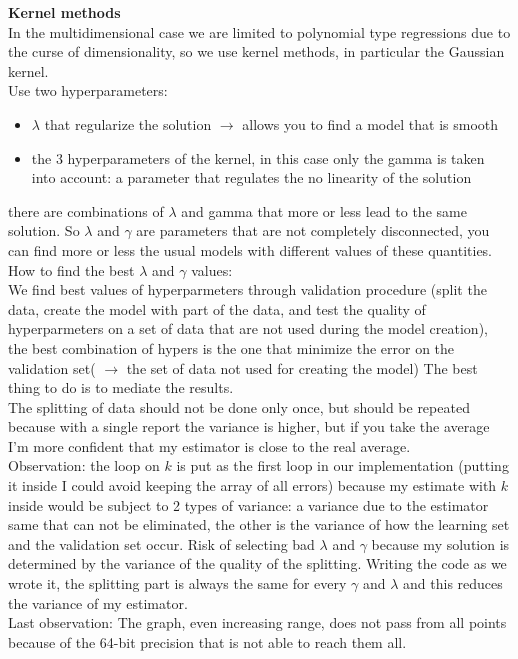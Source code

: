 \textbf {Kernel methods}\\

In the multidimensional case we are limited to polynomial type regressions due to the curse of dimensionality, so we use kernel methods, in particular the Gaussian kernel.\\
Use two hyperparameters:
\begin{itemize}
	\item $\lambda$ that regularize the solution $\rightarrow$ allows you to find a model that is smooth
	\item the 3 hyperparameters of the kernel, in this case only the gamma is taken into account: a parameter that regulates the no linearity of the solution
\end{itemize}
there are combinations of $\lambda$ and gamma that more or less lead to the same solution. So $\lambda$ and $\gamma$ are parameters that are not completely disconnected, you can find more or less the usual models with different values of these quantities.\\
How to find the best $\lambda$ and $\gamma$ values:\\
We find best values of hyperparmeters through validation procedure (split the data, create the model with part of the data, and test the quality of hyperparmeters on a set of data that are not used during the model creation), the best combination of hypers is the one that minimize the error on the validation set( $\rightarrow$ the set of data not used for creating the model)
The best thing to do is to mediate the results.\\
The splitting of data should not be done only once, but should be repeated because with a single report the variance is higher, but if you take the average I'm more confident that my estimator is close to the real average.\\
Observation: the loop on $k$ is put as the first loop in our implementation (putting it inside I could avoid keeping the array of all errors) because my estimate with $k$ inside would be subject to 2 types of variance: a variance due to the estimator same that can not be eliminated, the other is the variance of how the learning set and the validation set occur. Risk of selecting bad $\lambda$ and $\gamma$ because my solution is determined by the variance of the quality of the splitting. Writing the code as we wrote it, the splitting part is always the same for every $\gamma$ and $\lambda$ and this reduces the variance of my estimator.\\
Last observation: The graph, even increasing range, does not pass from all points because of the 64-bit precision that is not able to reach them all.



